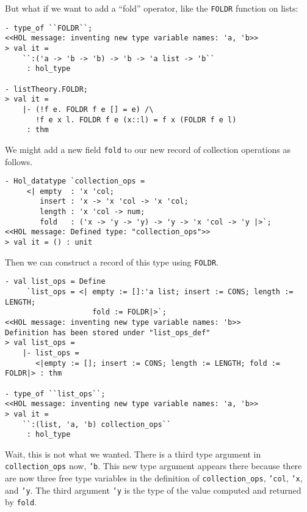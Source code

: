 But what if we
want to add a ``fold'' operator, like the \texttt{FOLDR} function on lists:

\begin{session}
\begin{verbatim}
- type_of ``FOLDR``;
<<HOL message: inventing new type variable names: 'a, 'b>>
> val it =
    ``:('a -> 'b -> 'b) -> 'b -> 'a list -> 'b``
     : hol_type

- listTheory.FOLDR;
> val it =
    |- (!f e. FOLDR f e [] = e) /\
       !f e x l. FOLDR f e (x::l) = f x (FOLDR f e l)
     : thm
\end{verbatim}
\end{session}

\noindent
We might add a new field \texttt{fold} to our new record of collection operations
as follows.

\begin{session}
\begin{verbatim}
- Hol_datatype `collection_ops =
     <| empty  : 'x 'col;
        insert : 'x -> 'x 'col -> 'x 'col;
        length : 'x 'col -> num;
        fold   : ('x -> 'y -> 'y) -> 'y -> 'x 'col -> 'y |>`;
<<HOL message: Defined type: "collection_ops">>
> val it = () : unit
\end{verbatim}
\end{session}

Then we can construct a record of this type using \texttt{FOLDR}.
\begin{session}
\begin{verbatim}
- val list_ops = Define
     `list_ops = <| empty := []:'a list; insert := CONS; length := LENGTH;
                    fold := FOLDR|>`;
<<HOL message: inventing new type variable names: 'b>>
Definition has been stored under "list_ops_def"
> val list_ops =
    |- list_ops =
       <|empty := []; insert := CONS; length := LENGTH; fold := FOLDR|> : thm

- type_of ``list_ops``;
<<HOL message: inventing new type variable names: 'a, 'b>>
> val it =
    ``:(list, 'a, 'b) collection_ops``
     : hol_type
\end{verbatim}
\end{session}

Wait, this is not what we wanted. There is a third type argument in
\texttt{collection\_ops} now, \texttt{'b}.
This new type argument appears there because there are now
three free type variables in the definition of \texttt{collection\_ops},
\texttt{'col}, \texttt{'x}, and \texttt{'y}.
The third argument
\texttt{'y}
is the type of the value computed and returned
by \texttt{fold}.

